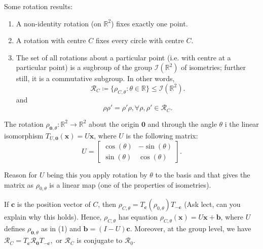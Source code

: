 \begin{corollary}
  Some rotation results:
  \begin{enumerate}
    \item A non-identity rotation (on \( \mathbb{R}^{2} \))  fixes exactly one point.
    \item A rotation with centre \( C \) fixes every circle with centre \( C. \)
    \item The set of all rotations about a particular point (i.e. with centre at a particular point)
      is a sugbroup of the group \( \mathscr{I} \left(\mathbb{R}^{2}  \right) \)
      of isometries; further still, it is a commutative subgroup. 
      In other words,
      \[
        \mathscr{R}_{C} \coloneqq \{\rho_{C, \theta } : \theta \in \mathbb{R}\} \le \mathscr{I}\left(\mathbb{R}^{2}  \right) 
      .\] 
      and
      \[
        \rho \rho' = \rho' \rho, \forall \rho, \rho' \in \mathscr{R}_{C}
      .\] 
  \end{enumerate}

\end{corollary}

\begin{theorem}
\item The rotation \( \rho_{\mathbf{0}, \theta } : \mathbb{R}^{2} \to \mathbb{R}^{2} \) about the origin \( \mathbf{0} \) and through
  the angle \( \theta  \) i the linear isomorphism \( T_{U,\mathbf{0}} \left( \mathbf{x} \right) = U \mathbf{x} \), where \( U \) is the following matrix:
  \[
    U = \begin{bmatrix} \cos \left( \theta  \right) & -\sin \left( \theta  \right) \\ \sin  \left( \theta  \right) & \cos \left( \theta  \right) \end{bmatrix} 
  .\] 

  Reason for \( U \) being this you apply rotation by \( \theta \) to the basis and that gives the matrix as \( \rho_{0, \theta } \) is a linear map (one of the properties of isometries).

\item If \( \mathbf{c} \) is the position vector of \( C \), then \( \rho_{C,\theta } = T_{\mathbf{c}}\left(\rho_{0, \theta }  \right)T_{-\mathbf{c}} \) (Ask lect, can you explain why this holds).
  Hence, \( \rho_{C,\theta} \) has equation \( \rho_{C, \theta} \left( \mathbf{x} \right) = U \mathbf{x} + \mathbf{b} \), where \( U \) defines \( \rho_{\mathbf{0}, \theta } \) 
  as in (1) and \( \mathbf{b} = \left(I - U  \right) \mathbf{c} \). Moreover, at the group level, we have \( \mathscr{R}_{C} = T_{\mathbf{c}}\mathscr{R}_{\mathbf{0}}T_{-\mathbf{c}}, \)
  or \( \mathscr{R}_{C} \) is conjugate to \( \mathscr{R}_{0} \).
\end{theorem}

